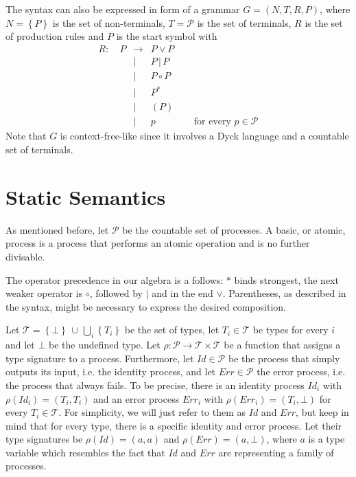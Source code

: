 The syntax can also be expressed in form of a grammar $G = \left( N, T, R, P \right)$, where $N = \left\{ P \right\}$ is the set of non-terminals, $T = \mathcal{P}$ is the set of terminals, $R$ is the set of production rules and $P$ is the start symbol \cite{Hopcroft:2006:IAT:1196416} with %
\begin{eqnarray*}
  R \colon \quad P & \to & P \vee P \\
    & | & P \,|\, P \\
    & | & P \circ P \\
    & | & P^* \\
    & | & \left( P \right) \\
    & | & p \quad\quad\quad\quad \text{for every } p \in \mathcal{P}
\end{eqnarray*}
Note that $G$ is context-free-like since it involves a Dyck language \cite{} and a countable set of terminals.

\section{Static Semantics}
\label{chp:static_semantics}
As mentioned before, let $\mathcal{P}$ be the countable set of processes. A basic, or atomic, process is a process that performs an atomic operation and is no further divisable.

The operator precedence in our algebra is a follows: $*$ binds strongest, the next weaker operator is $\circ$, followed by $|$ and in the end $\vee$. Parentheses, as described in the syntax, might be necessary to express the desired composition.

Let $\mathcal{T} = \left\{ \bot \right\} \, \cup \, \bigcup_i \left\{ T_i \right\}$ be the set of types, let $T_i \in \mathcal{T}$ be types for every $i$ and let $\bot$ be the undefined type. Let $\rho \colon \mathcal{P} \to \mathcal{T} \times \mathcal{T}$ be a function that assigns a type signature to a process. Furthermore, let $Id \in \mathcal{P}$ be the process that simply outputs its input, i.e. the identity process, and let $Err \in \mathcal{P}$ the error process, i.e. the process that always fails. To be precise, there is an identity process $Id_i$ with $\rho \left( Id_i \right) = \left( T_i, T_i \right)$ and an error process $Err_i$ with $\rho \left( Err_i \right) = \left( T_i, \bot \right)$ for every $T_i \in \mathcal{T}$. For simplicity, we will just refer to them as $Id$ and $Err$, but keep in mind that for every type, there is a specific identity and error process. Let their type signatures be $\rho \left( Id \right) = \left( a, a \right)$ and $\rho \left( Err \right) = \left( a, \bot \right)$, where $a$ is a type variable which resembles the fact that $Id$ and $Err$ are representing a family of processes.

